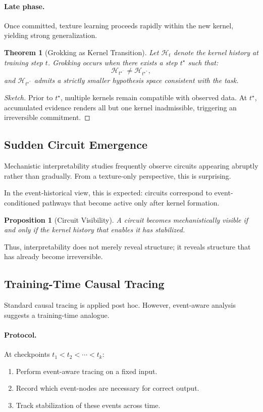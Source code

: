 \documentclass[11pt]{article}
\newtheorem{proposition}{Proposition}
\newtheorem{theorem}{Theorem}
\theoremstyle{remark}
\newcommand{\Hist}{\mathcal{H}}
\begin{document}
\paragraph{Late phase.}
Once committed, texture learning proceeds rapidly within the new
kernel, yielding strong generalization.

\begin{theorem}[Grokking as Kernel Transition]
Let $\Hist_t$ denote the kernel history at training step $t$. Grokking
occurs when there exists a step $t^\star$ such that:
\[
\Hist_{t^\star^-} \neq \Hist_{t^\star^+},
\]
and $\Hist_{t^\star^+}$ admits a strictly smaller hypothesis space
consistent with the task.
\end{theorem}

\begin{proof}[Sketch]
Prior to $t^\star$, multiple kernels remain compatible with observed
data. At $t^\star$, accumulated evidence renders all but one kernel
inadmissible, triggering an irreversible commitment.
\end{proof}

\subsection{Sudden Circuit Emergence}

Mechanistic interpretability studies frequently observe circuits
appearing abruptly rather than gradually. From a texture-only
perspective, this is surprising.

In the event-historical view, this is expected: circuits correspond to
event-conditioned pathways that become active only after kernel
formation.

\begin{proposition}[Circuit Visibility]
A circuit becomes mechanistically visible if and only if the kernel
history that enables it has stabilized.
\end{proposition}

Thus, interpretability does not merely reveal structure; it reveals
structure that has already become irreversible.

\subsection{Training-Time Causal Tracing}

Standard causal tracing is applied post hoc. However, event-aware
analysis suggests a training-time analogue.

\paragraph{Protocol.}
At checkpoints $t_1 < t_2 < \cdots < t_k$:
\begin{enumerate}
\item Perform event-aware tracing on a fixed input.
\item Record which event-nodes are necessary for correct output.
\item Track stabilization of these events across time.
\end{enumerate}
\end{document}

